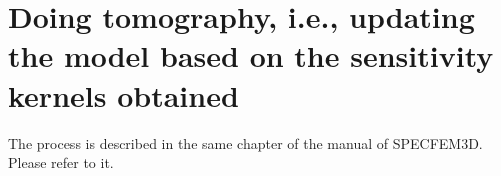 \chapter{Doing tomography, i.e., updating the model based on the sensitivity kernels obtained}


The process is described in the same chapter of the manual of SPECFEM3D. Please refer to it.



